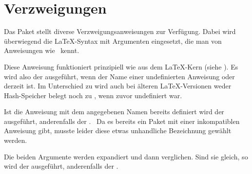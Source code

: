 \section{Verzweigungen}

Das Paket  stellt diverse Verzweigungsanweisungen zur
Verfügung. Dabei wird überwiegend die \LaTeX-Syntax mit Argumenten eingesetzt,
die man von Anweisungen wie %
\ kennt.

\begin{Declaration}
\end{Declaration}
Diese Anweisung funktioniert
prinzipiell wie  aus dem \LaTeX-Kern (siehe
\cite{latex:source2e}). Es wird also der  ausgeführt, wenn
 der Name einer undefinierten Anweisung oder 
derzeit  ist. Im Unterschied zu  wird auch
bei älteren \LaTeX-Versionen %
\iftrue%
weder Hash-Speicher belegt noch  %
\else%
\Macro{\PName{Name}} nicht %
\fi%
zu , wenn  zuvor undefiniert
war.
\EndIndexGroup


\begin{Declaration}
\end{Declaration}
Ist die Anweisung mit dem angegebenen
Namen bereits definiert wird der  ausgeführt, anderenfalls
der .\iftrue %
\ Da es bereits ein Paket mit einer inkompatiblen
Anweisung  gibt, musste leider diese etwas unhandliche
Bezeichnung gewählt werden.%
\iffalse%
\iftrue%
\ Von dieser Anweisung gibt es keine interne Variante.%
\else%
\ Es gibt keine interne Variante.%
\fi%
\fi%
\fi%
\EndIndexGroup


\begin{Declaration}
\end{Declaration}
Die beiden Argumente 
werden expandiert und dann verglichen. Sind sie gleich, so wird der
 ausgeführt, anderenfalls der .%
\iffalse%
\iftrue%
\ Von dieser Anweisung gibt es keine interne Variante.%
\else%
\ Es gibt keine interne Variante.%
\fi%
\fi%
\EndIndexGroup


